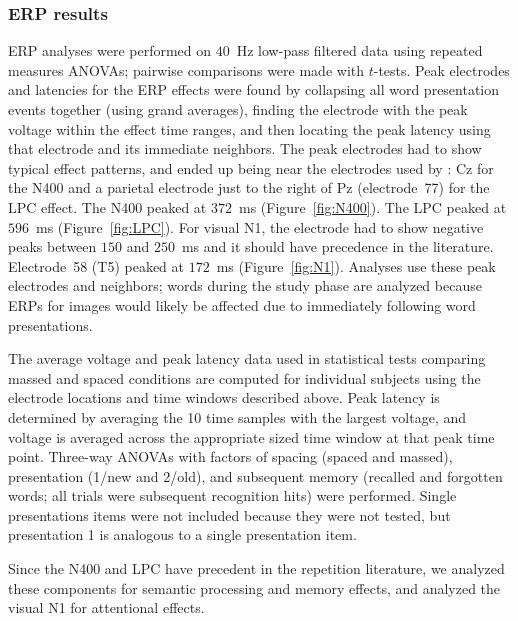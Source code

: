 \subsubsection{ERP results}

ERP analyses were performed on $40$~Hz low-pass filtered data using repeated measures ANOVAs; pairwise comparisons were made with $t$-tests.  Peak electrodes and latencies for the ERP effects were found by collapsing all word presentation events together (using grand averages), finding the electrode with the peak voltage within the effect time ranges, and then locating the peak latency using that electrode and its immediate neighbors.  The peak electrodes had to show typical effect patterns, and ended up being near the electrodes used by : Cz for the N400 and a parietal electrode just to the right of Pz (electrode~77) for the LPC effect.  The N400 peaked at $372$~ms (Figure~\ref{fig:N400}).  The LPC peaked at $596$~ms (Figure~\ref{fig:LPC}).  For visual N1, the electrode had to show negative peaks between $150$ and $250$~ms and it should have precedence in the literature.  Electrode~58 (T5) peaked at $172$~ms (Figure~\ref{fig:N1}).  Analyses use these peak electrodes and neighbors; words during the study phase are analyzed because ERPs for images would likely be affected due to immediately following word presentations.

\cbstart
The average voltage and peak latency data used in statistical tests comparing massed and spaced conditions are computed for individual subjects using the electrode locations and time windows described above.  Peak latency is determined by averaging the 10 time samples with the largest voltage, and voltage is averaged across the appropriate sized time window at that peak time point.
Three-way ANOVAs with factors of spacing (spaced and massed), presentation (1/new and 2/old), and subsequent memory (recalled and forgotten words; all trials were subsequent recognition hits) were performed.  Single presentations items were not included because they were not tested, but presentation 1 is analogous to a single presentation item.
\cbend

Since the N400 and LPC have precedent in the repetition literature, we analyzed these components for semantic processing and memory effects, and analyzed the visual N1 for attentional effects.


